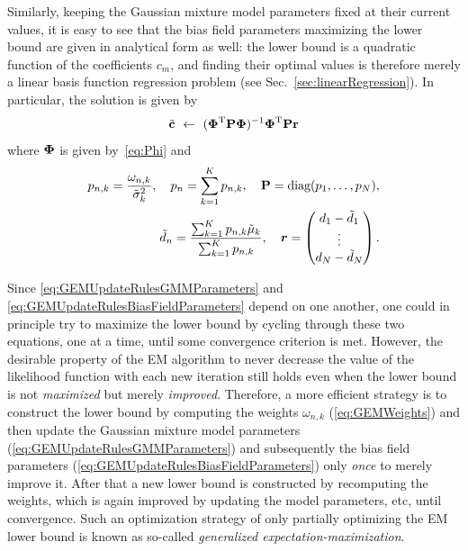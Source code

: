 \documentclass[10pt,twoside]{book}
\begin{document}
Similarly, keeping the Gaussian mixture model parameters fixed at their current values, it is easy to see that the bias field parameters maximizing the lower bound are given in analytical form as well: the lower bound is a quadratic function of the coefficients $c_m$, and finding their optimal values is therefore merely a linear basis function regression problem (see Sec.~\ref{sec:linearRegression}). In particular, the solution is given by
\begin{equation}
  \tilde{\mathbf{c}} \,\, \gets \,\, ( {\mbox{\boldmath {${\Phi}$}}}^\mathrm{T} \mathbf{P} {\mbox{\boldmath {${\Phi}$}}} )^{-1} {\mbox{\boldmath {${\Phi}$}}}^\mathrm{T} \mathbf{P} \mathbf{r}
  \label{eq:GEMUpdateRulesBiasFieldParameters}
\end{equation}
where 
${\mbox{\boldmath {${\Phi}$}}}$ is given by~\eqref{eq:Phi}
and
\begin{eqnarray*}
p_{n,k} =
\frac{ \omega_{n,k} }{\tilde{\sigma}_k^2}, 
\quad
p_n = \sum_{k=1}^K p_{n,k},
\quad
\fat{P} = \mbox{diag}(p_1, \ldots, p_N), 
\\
\tilde{d}_n = \frac{\sum_{k=1}^K p_{n,k} \tilde{\mu}_k}{\sum_{k=1}^K p_{n,k} },
\quad
\bldgr{r} =
\left(
\begin{array}{@{}c@{}}
   d_1 - \tilde{d}_1\\
   \vdots \\
   d_N - \tilde{d}_N
\end{array}
\right).
\end{eqnarray*}

Since \eqref{eq:GEMUpdateRulesGMMParameters} and \eqref{eq:GEMUpdateRulesBiasFieldParameters} depend on one another, one could
in principle try to maximize the lower bound by cycling through these two equations, one at a time, until some convergence criterion is met.
However, the desirable property of the EM algorithm to never decrease the value of the likelihood function with each new iteration
still holds even when the lower bound is not \emph{maximized} but merely \emph{improved}. Therefore, a more efficient strategy is to 
construct the lower bound by computing the weights $\omega_{n,k}$ (\eqref{eq:GEMWeights}) and then 
update the Gaussian mixture model parameters (\eqref{eq:GEMUpdateRulesGMMParameters}) and subsequently the bias field parameters 
(\eqref{eq:GEMUpdateRulesBiasFieldParameters})  only \emph{once} to merely improve it. After that a new lower bound is
constructed by recomputing the weights, which is again improved by updating the model parameters, etc, until convergence. 
Such an optimization strategy of only partially optimizing the EM lower bound is known as so-called
\emph{generalized expectation-maximization}.
\end{document}
